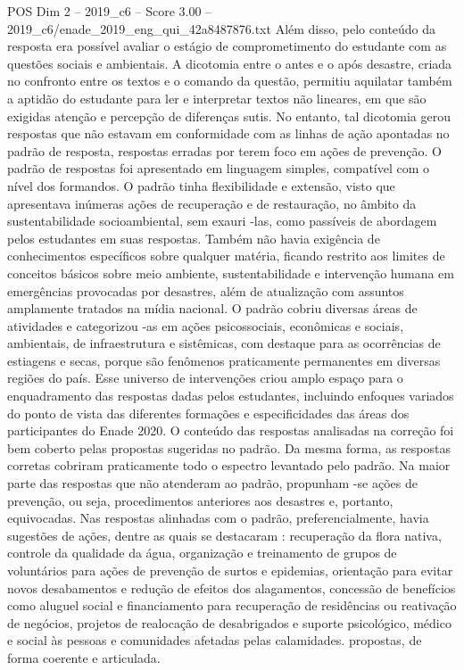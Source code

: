 \begin{textsample}{POS Dim 2 – 2019\_c6 – Score 3.00 – 2019\_c6/enade\_2019\_eng\_qui\_42a8487876.txt}
Além disso, pelo conteúdo da resposta era possível avaliar o estágio de comprometimento do estudante com as questões sociais e ambientais.
A dicotomia entre o antes e o após desastre, criada no confronto entre os textos e o comando da questão, permitiu aquilatar também a aptidão do estudante para ler e interpretar textos não lineares, em que são exigidas atenção e percepção de diferenças sutis.
No entanto, tal dicotomia gerou respostas que não estavam em conformidade com as linhas de ação apontadas no padrão de resposta, respostas erradas por terem foco em ações de prevenção.
O padrão de respostas foi apresentado em linguagem simples, compatível com o nível dos formandos.
O padrão tinha flexibilidade e extensão, visto que apresentava inúmeras ações de recuperação e de restauração, no âmbito da sustentabilidade socioambiental, sem exauri -las, como passíveis de abordagem pelos estudantes em suas respostas.
Também não havia exigência de conhecimentos específicos sobre qualquer matéria, ficando restrito aos limites de conceitos básicos sobre meio ambiente, sustentabilidade e intervenção humana em emergências provocadas por desastres, além de atualização com assuntos amplamente tratados na mídia nacional.
O padrão cobriu diversas áreas de atividades e categorizou -as em ações psicossociais, econômicas e sociais, ambientais, de infraestrutura e sistêmicas, com destaque para as ocorrências de estiagens e secas, porque são fenômenos praticamente permanentes em diversas regiões do país.
Esse universo de intervenções criou amplo espaço para o enquadramento das respostas dadas pelos estudantes, incluindo enfoques variados do ponto de vista das diferentes formações e especificidades das áreas dos participantes do Enade 2020.
O conteúdo das respostas analisadas na correção foi bem coberto pelas propostas sugeridas no padrão.
Da mesma forma, as respostas corretas cobriram praticamente todo o espectro levantado pelo padrão.
Na maior parte das respostas que não atenderam ao padrão, propunham -se ações de prevenção, ou seja, procedimentos anteriores aos desastres e, portanto, equivocadas.
Nas respostas alinhadas com o padrão, preferencialmente, havia sugestões de ações, dentre as quais se destacaram : recuperação da flora nativa, controle da qualidade da água, organização e treinamento de grupos de voluntários para ações de prevenção de surtos e epidemias, orientação para evitar novos desabamentos e redução de efeitos dos alagamentos, concessão de benefícios como aluguel social e financiamento para recuperação de residências ou reativação de negócios, projetos de realocação de desabrigados e suporte psicológico, médico e social às pessoas e comunidades afetadas pelas calamidades. propostas, de forma coerente e articulada.

\end{textsample}
